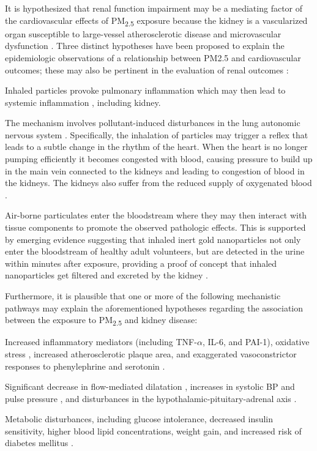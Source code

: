 \documentclass[11pt]{article}
\newcommand{\tsub}{\textsubscript}
\begin{document}
It is hypothesized that renal function impairment may be a mediating factor of the cardiovascular effects of PM\tsub{2.5} exposure because the kidney is a vascularized organ susceptible to large-vessel atherosclerotic disease and microvascular dysfunction \citep{lue2013residential}. Three distinct hypotheses have been proposed to explain the epidemiologic observations of a relationship between PM2.5 and cardiovascular outcomes; these may also be pertinent in the evaluation of renal outcomes \citep{bowe2018particulate}:
\begin{enumerate*}[{[1)]}]
    \item Inhaled particles provoke pulmonary inflammation which may then lead to systemic inflammation \citep{chin2014basic}, including kidney. 
    \item The mechanism involves pollutant-induced disturbances in the lung autonomic nervous system \citep{chin2014basic}. Specifically, the inhalation of particles may trigger a reflex that leads to a subtle change in the rhythm of the heart. When the heart is no longer pumping efficiently it becomes congested with blood, causing pressure to build up in the main vein connected to the kidneys and leading to congestion of blood in the kidneys. The kidneys also suffer from the reduced supply of oxygenated blood \citep{kazory2009anemia}. 
    \item Air-borne particulates enter the bloodstream where they may then interact with tissue components to promote the observed pathologic effects. This is supported by emerging evidence suggesting that inhaled inert gold nanoparticles not only enter the bloodstream of healthy adult volunteers, but are detected in the urine within minutes after exposure, providing a proof of concept that inhaled nanoparticles get filtered and excreted by the kidney \citep{chin2014basic, miller2017inhaled}.
\end{enumerate*}
Furthermore, it is plausible that one or more of the following mechanistic pathways may explain the aforementioned hypotheses regarding the association between the exposure to PM\tsub{2.5} and kidney disease:
\begin{enumerate*}[{[1)]}]
    \item Increased inflammatory mediators (including TNF-$\alpha$, IL-6, and PAI-1), oxidative stress \citep{ostro2014chronic, ruckerl2014associations, sorensen2003personal}, increased atherosclerotic plaque area, and exaggerated vasoconstrictor responses to phenylephrine and serotonin \citep{sun2005long}.
    \item Significant decrease in flow-mediated dilatation \citep{krishnan2012vascular, wilker2014relation}, increases in systolic BP and pulse pressure \citep{auchincloss2008associations, fuks2014arterial, fuks2011long}, and disturbances in the hypothalamic-pituitary-adrenal axis \citep{thomson2013mapping}.
    \item  Metabolic disturbances, including glucose intolerance, decreased insulin sensitivity, higher blood lipid concentrations, weight gain, and increased risk of diabetes mellitus \citep{wei2016chronic, chen2016ambient, wolf2016association}.
\end{enumerate*}
\end{document}
